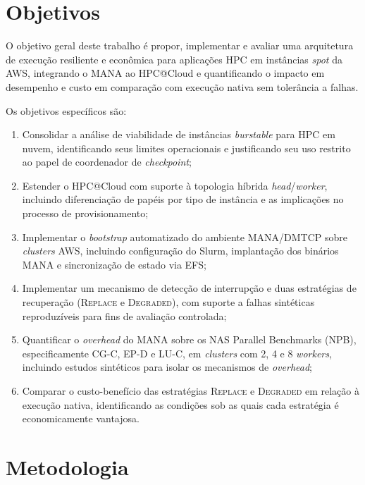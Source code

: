 \begin{resumo}
\section*{Objetivos}

O objetivo geral deste trabalho é propor, implementar e avaliar uma arquitetura
de execução resiliente e econômica para aplicações HPC em instâncias
\textit{spot} da AWS, integrando o MANA ao HPC@Cloud e quantificando o impacto
em desempenho e custo em comparação com execução nativa sem tolerância a falhas.

Os objetivos específicos são:
\begin{enumerate}
  \item Consolidar a análise de viabilidade de instâncias \textit{burstable}
        para HPC em nuvem, identificando seus limites operacionais e justificando
        seu uso restrito ao papel de coordenador de \textit{checkpoint};
  \item Estender o HPC@Cloud com suporte à topologia híbrida
        \textit{head}/\textit{worker}, incluindo diferenciação de papéis por
        tipo de instância e as implicações no processo de provisionamento;
  \item Implementar o \textit{bootstrap} automatizado do ambiente MANA/DMTCP
        sobre \textit{clusters} AWS, incluindo configuração do Slurm,
        implantação dos binários MANA e sincronização de estado via EFS;
  \item Implementar um mecanismo de detecção de interrupção e duas estratégias
        de recuperação (\textsc{Replace} e \textsc{Degraded}), com suporte a
        falhas sintéticas reproduzíveis para fins de avaliação controlada;
  \item Quantificar o \textit{overhead} do MANA sobre os NAS Parallel
        Benchmarks (NPB), especificamente CG-C, EP-D e LU-C, em
        \textit{clusters} com 2, 4 e 8 \textit{workers}, incluindo estudos
        sintéticos para isolar os mecanismos de \textit{overhead};
  \item Comparar o custo-benefício das estratégias \textsc{Replace} e
        \textsc{Degraded} em relação à execução nativa, identificando as
        condições sob as quais cada estratégia é economicamente vantajosa.
\end{enumerate}


\section*{Metodologia}


\end{resumo}
